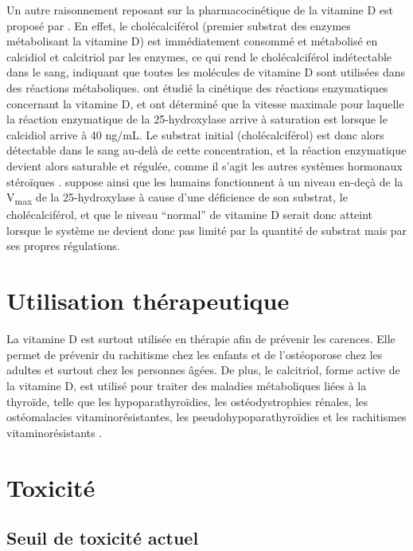 \documentclass[
  a4paper,
  DIV=11,
  numbers=noendperiod,
  listof=totoc]{scrreprt}
\begin{document}
Un autre raisonnement reposant sur la pharmacocinétique de la vitamine D
est proposé par \textcite{Cannell.2008}. En effet, le cholécalciférol
(premier substrat des enzymes métabolisant la vitamine D) est
immédiatement consommé et métabolisé en calcidiol et calcitriol par les
enzymes, ce qui rend le cholécalciférol indétectable dans le sang,
indiquant que toutes les molécules de vitamine D sont utilisées dans des
réactions métaboliques. \textcite{Hollis.2007} ont étudié la cinétique
des réactions enzymatiques concernant la vitamine D, et ont déterminé
que la vitesse maximale pour laquelle la réaction enzymatique de la
25-hydroxylase arrive à saturation est lorsque le calcidiol arrive à 40
ng/mL. Le substrat initial (cholécalciférol) est donc alors détectable
dans le sang au-delà de cette concentration, et la réaction enzymatique
devient alors saturable et régulée, comme il s'agit les autres systèmes
hormonaux stéroïques \autocite{Cannell.2008}. \textcite{Hollis.2007}
suppose ainsi que les humains fonctionnent à un niveau en-deçà de la
V\textsubscript{max} de la 25-hydroxylase à cause d'une déficience de
son substrat, le cholécalciférol, et que le niveau ``normal'' de
vitamine D serait donc atteint lorsque le système ne devient donc pas
limité par la quantité de substrat mais par ses propres régulations.

\hypertarget{utilisation-thuxe9rapeutique}{%
\section{Utilisation thérapeutique}\label{utilisation-thuxe9rapeutique}}

La vitamine D est surtout utilisée en thérapie afin de prévenir les
carences. Elle permet de prévenir du rachitisme chez les enfants et de
l'ostéoporose chez les adultes et surtout chez les personnes âgées. De
plus, le calcitriol, forme active de la vitamine D, est utilisé pour
traiter des maladies métaboliques liées à la thyroïde, telle que les
hypoparathyroïdies, les ostéodystrophies rénales, les ostéomalacies
vitaminorésistantes, les pseudohypoparathyroïdies et les rachitismes
vitaminorésistants \autocite{VIDAL.2013}.

\hypertarget{toxicituxe9}{%
\section{Toxicité}\label{toxicituxe9}}

\hypertarget{seuil-de-toxicituxe9-actuel}{%
\subsection{Seuil de toxicité
actuel}\label{seuil-de-toxicituxe9-actuel}}
\end{document}
